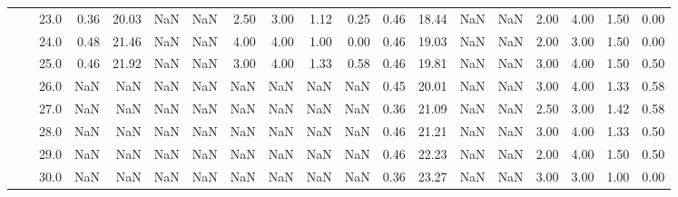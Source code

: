 \begin{tabular}{lllrrrrrrrrrrrrrrrr}
      &     & 23.0 &      0.36 &      20.03 &               NaN &                NaN & 2.50 &   3.00 &             1.12 &                         0.25 &      0.46 &      18.44 &               NaN &                NaN & 2.00 &   4.00 &             1.50 &                         0.00 \\
      &     & 24.0 &      0.48 &      21.46 &               NaN &                NaN & 4.00 &   4.00 &             1.00 &                         0.00 &      0.46 &      19.03 &               NaN &                NaN & 2.00 &   3.00 &             1.50 &                         0.00 \\
      &     & 25.0 &      0.46 &      21.92 &               NaN &                NaN & 3.00 &   4.00 &             1.33 &                         0.58 &      0.46 &      19.81 &               NaN &                NaN & 3.00 &   4.00 &             1.50 &                         0.50 \\
      &     & 26.0 &       NaN &        NaN &               NaN &                NaN &  NaN &    NaN &              NaN &                          NaN &      0.45 &      20.01 &               NaN &                NaN & 3.00 &   4.00 &             1.33 &                         0.58 \\
      &     & 27.0 &       NaN &        NaN &               NaN &                NaN &  NaN &    NaN &              NaN &                          NaN &      0.36 &      21.09 &               NaN &                NaN & 2.50 &   3.00 &             1.42 &                         0.58 \\
      &     & 28.0 &       NaN &        NaN &               NaN &                NaN &  NaN &    NaN &              NaN &                          NaN &      0.46 &      21.21 &               NaN &                NaN & 3.00 &   4.00 &             1.33 &                         0.50 \\
      &     & 29.0 &       NaN &        NaN &               NaN &                NaN &  NaN &    NaN &              NaN &                          NaN &      0.46 &      22.23 &               NaN &                NaN & 2.00 &   4.00 &             1.50 &                         0.50 \\
      &     & 30.0 &       NaN &        NaN &               NaN &                NaN &  NaN &    NaN &              NaN &                          NaN &      0.36 &      23.27 &               NaN &                NaN & 3.00 &   3.00 &             1.00 &                         0.00 \\

\end{tabular}
